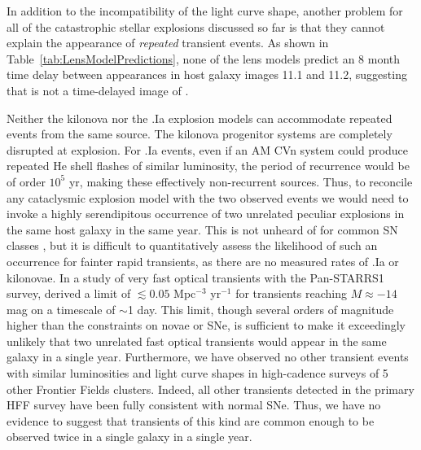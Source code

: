 In addition to the incompatibility of the light curve shape, another
problem for all of the catastrophic stellar explosions discussed so
far is that they cannot explain the appearance of {\it repeated}
transient events.  As shown in Table~\ref{tab:LensModelPredictions}, none of
the  lens models predict an 8 month time delay between
appearances in host galaxy images 11.1 and 11.2, suggesting that
\spocktwo is not a time-delayed image of \spockone \citep[as was the
  case for the 5th image of SN Refsdal;][]{Kelly:2015a,Kelly:2016a}.

Neither the kilonova nor the .Ia explosion models can accommodate
repeated events from the same source. The kilonova progenitor systems
are completely disrupted at explosion.  For .Ia events, even if an AM
CVn system could produce repeated He shell flashes of similar
luminosity, the period of recurrence would be of order $10^5$ yr,
making these effectively non-recurrent sources.  Thus, to reconcile
any cataclysmic explosion model with the two observed \spock events we
would need to invoke a highly serendipitous occurrence of two
unrelated peculiar explosions in the same host galaxy in the same
year. This is not unheard of for common SN classes
\citep[e.g.][]{Poznanski:2009}, but it is difficult to quantitatively
assess the likelihood of such an occurrence for fainter rapid
transients, as there are no measured rates of .Ia or kilonovae.  In a
study of very fast optical transients with the Pan-STARRS1 survey,
\citet{Berger:2013b} derived a limit of $\lesssim0.05$ Mpc$^{-3}$
yr$^{-1}$ for transients reaching $M\approx -14$ mag on a timescale of
$\sim$1 day.  This limit, though several orders of magnitude higher
than the constraints on novae or SNe, is sufficient to make it
exceedingly unlikely that two unrelated fast optical transients would
appear in the same galaxy in a single year.  Furthermore, we have
observed no other transient events with similar luminosities and light
curve shapes in high-cadence surveys of 5 other Frontier Fields
clusters. Indeed, all other transients detected in the primary HFF
survey have been fully consistent with normal SNe.  Thus, we have no
evidence to suggest that transients of this kind are common enough to
be observed twice in a single galaxy in a single year.


